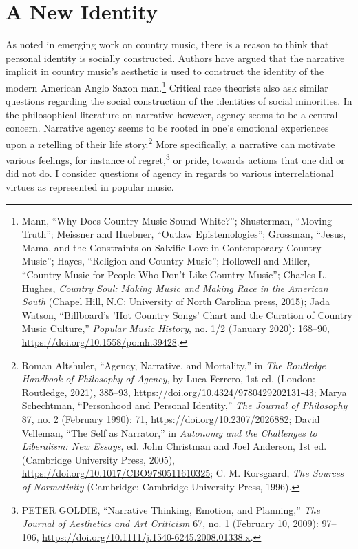 \documentclass[phdthesis,12pt,final]{wuthesis}
\theoremstyle{definition}
\theoremstyle{definition}
\theoremstyle{definition}
\theoremstyle{definition}
\theoremstyle{remark}
\begin{document}
\chapter{A New Identity}\label{a-new-identity}

As noted in emerging work on country music, there is a reason to think that personal identity is socially constructed. Authors have argued that the narrative implicit in country music's aesthetic is used to construct the identity of the modern American Anglo Saxon man.\footnote{Mann, {``Why Does Country Music Sound White?''}; Shusterman, {``Moving {Truth}''}; Meissner and Huebner, {``Outlaw Epistemologies''}; Grossman, {``Jesus, {Mama}, and the {Constraints} on {Salvific Love} in {Contemporary Country Music}''}; Hayes, {``Religion and {Country Music}''}; Hollowell and Miller, {``Country {Music} for {People Who Don}'t {Like Country Music}''}; Charles L. Hughes, \emph{Country Soul: Making Music and Making Race in the {American South}} (Chapel Hill, N.C: University of North Carolina press, 2015); Jada Watson, {``Billboard's '{Hot Country Songs}' Chart and the Curation of Country Music Culture,''} \emph{Popular Music History}, no. 1/2 (January 2020): 168--90, \url{https://doi.org/10.1558/pomh.39428}.} Critical race theorists also ask similar questions regarding the social construction of the identities of social minorities. In the philosophical literature on narrative however, agency seems to be a central concern. Narrative agency seems to be rooted in one's emotional experiences upon a retelling of their life story.\footnote{Roman Altshuler, {``Agency, Narrative, and Mortality,''} in \emph{The {Routledge Handbook} of {Philosophy} of {Agency}}, by Luca Ferrero, 1st ed. (London: Routledge, 2021), 385--93, \url{https://doi.org/10.4324/9780429202131-43}; Marya Schechtman, {``Personhood and {Personal Identity},''} \emph{The Journal of Philosophy} 87, no. 2 (February 1990): 71, \url{https://doi.org/10.2307/2026882}; David Velleman, {``The {Self} as {Narrator},''} in \emph{Autonomy and the {Challenges} to {Liberalism}: {New Essays}}, ed. John Christman and Joel Anderson, 1st ed. (Cambridge University Press, 2005), \url{https://doi.org/10.1017/CBO9780511610325}; C. M. Korsgaard, \emph{The Sources of Normativity} (Cambridge: Cambridge University Press, 1996).} More specifically, a narrative can motivate various feelings, for instance of regret,\footnote{PETER GOLDIE, {``Narrative {Thinking}, {Emotion}, and {Planning},''} \emph{The Journal of Aesthetics and Art Criticism} 67, no. 1 (February 10, 2009): 97--106, \url{https://doi.org/10.1111/j.1540-6245.2008.01338.x}.} or pride, towards actions that one did or did not do. I consider questions of agency in regards to various interrelational virtues as represented in popular music.
\end{document}
